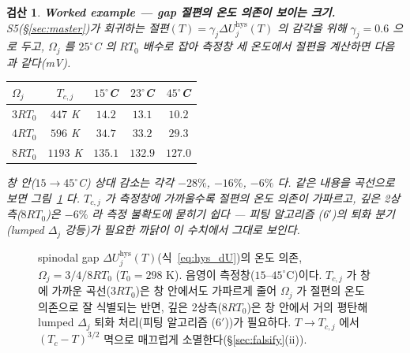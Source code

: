 \documentclass[11pt,a4paper]{article}
\newtheorem*{verifybox}{검산}
\newcommand{\hys}{\mathrm{hys}}
\begin{document}
\begin{verifybox}
\textbf{Worked example — gap 절편의 온도 의존이 보이는 크기.} S5(\S\ref{sec:master})가 회귀하는 절편$(T)=\gamma_j\Delta U_j^\hys(T)$
의 감각을 위해 $\gamma_j=0.6$ 으로 두고, $\Omega_j$ 를 $25^\circ$C 의 $RT_0$ 배수로 잡아 측정창 세 온도에서
절편을 계산하면 다음과 같다(mV).
\begin{center}
\renewcommand{\arraystretch}{1.25}
\begin{tabular}{lcccc}
\toprule
$\Omega_j$ & $T_{c,j}$ & $15^\circ$C & $23^\circ$C & $45^\circ$C \\
\midrule
$3RT_0$ & $447$ K & $14.2$ & $13.1$ & $10.2$ \\
$4RT_0$ & $596$ K & $34.7$ & $33.2$ & $29.3$ \\
$8RT_0$ & $1193$ K & $135.1$ & $132.9$ & $127.0$ \\
\bottomrule
\end{tabular}
\end{center}
창 안($15\to45^\circ$C) 상대 감소는 각각 $-28\%$, $-16\%$, $-6\%$ 다. 같은 내용을 곡선으로 보면
그림~\ref{fig:gapT} 다. $T_{c,j}$ 가 측정창에 가까울수록
절편의 온도 의존이 가파르고, 깊은 2상측($8RT_0$)은 $-6\%$ 라 측정 불확도에 묻히기 쉽다 — 피팅 알고리즘
(6$'$)의 퇴화 분기(lumped $\Delta_j$ 강등)가 필요한 까닭이 이 수치에서 그대로 보인다.
\end{verifybox}
\begin{figure}[t]
\centering
{}
\caption{spinodal gap $\Delta U_j^\hys(T)$(식~\eqref{eq:hys_dU})의 온도 의존, $\Omega_j=3/4/8RT_0$
($T_0=298$ K). 음영이 측정창($15$--$45^\circ$C)이다. $T_{c,j}$ 가 창에 가까운 곡선($3RT_0$)은 창 안에서도
가파르게 줄어 $\Omega_j$ 가 절편의 온도 의존으로 잘 식별되는 반면, 깊은 2상측($8RT_0$)은 창 안에서 거의
평탄해 lumped $\Delta_j$ 퇴화 처리(피팅 알고리즘 (6$'$))가 필요하다. $T\to T_{c,j}$ 에서 $(T_c-T)^{3/2}$
멱으로 매끄럽게 소멸한다(\S\ref{sec:falsify}(ii)).}
\label{fig:gapT}
\end{figure}
\end{document}
